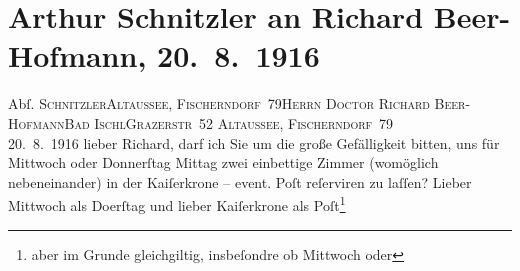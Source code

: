 

         
         \renewcommand{\erwaehntePersonen}{Personen: Richard Beer-Hofmann}
         \renewcommand{\erwaehnteOrte}{Orte: Altaussee, Aschau, Bad Aussee, Bad Ischl, Fischerndorf, Grazer Straße, Hoher Koppen, Hotel Kaiserkrone, Hotel Post, Pötschenpass, Restaurant Sonnenschein}
         \renewcommand{\erwaehnteWerke}{}
               \section[Arthur Schnitzler an Richard Beer-Hofmann, 20. 8. 1916]{ Arthur Schnitzler an Richard Beer-Hofmann, 20. 8. 1916}\nopagebreak{}\rehead{ }\begin{ledgroupsized}[t]{13cm}\normalsize\beginnumbering \toendnotes[C]{\smallbreak\pagebreak[2]} 
\pstart{}{\pb}Abſ. \textsc{Schnitzler}\pend{}\pstart{}\textsc{Altaussee, Fischerndorf 79}\pend{}{\bigskip}\pstart{}\textsc{Herrn Doctor Richard Beer-Hofmann}\pend{}\pstart{}\textsc{Bad Ischl}\pend{}\pstart{}\textsc{Grazerstr 52}\pend{}{\bigskip}\pstart
           \raggedleft{}{\pb}\textsc{Altaussee, Fischerndorf 79}{\\}20. 8. 1916\pend
           \pstart
           lieber Richard, darf ich Sie um die große Gefälligkeit bitten, uns
               für Mittwoch oder Donnerſtag{ }Mittag zwei einbettige Zimmer (womöglich nebeneinander) in der Kaiſerkrone – event. Poſt reſerviren zu laſſen? Lieber Mittwoch als Do{\geminationn}erſtag und lieber Kaiſerkrone als Poſt\footnote{\noindent{}aber im Grunde gleichgiltig, insbeſondre ob Mittwoch oder
}
\end{ledgroupsized}
